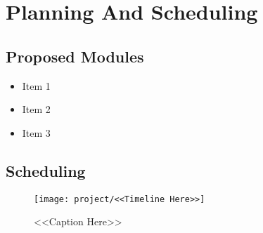 \chapter{Planning And Scheduling}


\section{Proposed Modules}

\begin{itemize}
\item{Item 1}
\item{Item 2}
\item{Item 3}
\end{itemize}

\section{Scheduling}

\begin{figure}[H]
\centering
\texttt{[image: project/<<Timeline Here>>]}
\caption{<<Caption Here>>}
\label{<<Label Here>>}
\end{figure}

